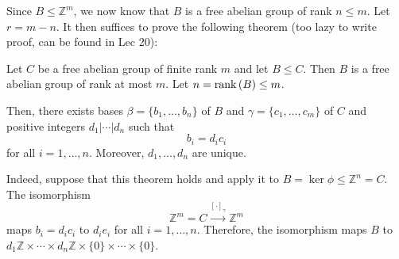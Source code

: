 \documentclass{article}
\begin{document}
Since $B \le \mathbb{Z}^m$, we now know that $B$ is a free abelian group of rank $n \le m$. Let $r=m-n$. It then suffices to prove the following theorem (too lazy to write proof, can be found in Lec 20):
\begin{idea}
    Let $C$ be a free abelian group of finite rank $m$ and let $B \le C$. Then $B$ is a free abelian group of rank at most $m$. Let $n=\mathrm{rank}\,(B) \le m$.
    \vspace{2mm}

    Then, there exists bases $\beta =\{b_1,\dots,b_n\}$ of $B$ and $\gamma=\{c_1,\dots,c_m\}$ of $C$ and positive integers $d_1|\cdots | d_n$ such that
    \begin{equation}
        b_i = d_i c_i
    \end{equation}
    for all $i=1,\dots, n$. Moreover, $d_1,\dots,d_n$ are unique.
\end{idea}
Indeed, suppose that this theorem holds and apply it to $B=\ker\phi \le \mathbb{Z}^n = C$. The isomorphism
\begin{equation}
    \mathbb{Z}^m = C \xrightarrow{[\cdot]_\gamma} \mathbb{Z}^m
\end{equation}
maps $b_i = d_ic_i$ to $d_ie_i$ for all $i=1,\dots, n$. Therefore, the isomorphism maps $B$ to $d_1\mathbb{Z} \times \cdots \times d_n\mathbb{Z}\times \{0\} \times \cdots \times \{0\}$.
\end{document}
